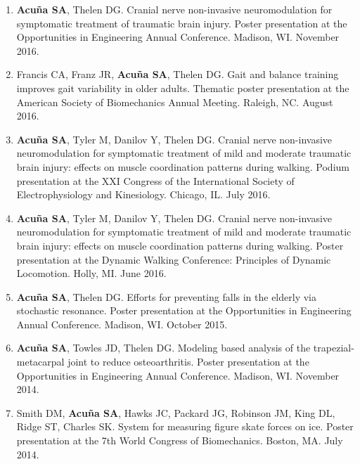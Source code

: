 \documentclass[letterpaper, 10pt]{article}
\begin{document}
\begin{enumerate}
    \item \textbf{Acuña SA}, Thelen DG. Cranial nerve non-invasive neuromodulation for symptomatic treatment of traumatic brain injury. Poster presentation at the Opportunities in Engineering Annual Conference. Madison, WI. November 2016.
    \item Francis CA, Franz JR, \textbf{Acuña SA}, Thelen DG. Gait and balance training improves gait variability in older adults. Thematic poster presentation at the American Society of Biomechanics Annual Meeting. Raleigh, NC. August 2016.
    \item \textbf{Acuña SA}, Tyler M, Danilov Y, Thelen DG. Cranial nerve non-invasive neuromodulation for symptomatic treatment of mild and moderate traumatic brain injury: effects on muscle coordination patterns during walking. Podium presentation at the XXI Congress of the International Society of Electrophysiology and Kinesiology. Chicago, IL. July 2016.
    \item \textbf{Acuña SA}, Tyler M, Danilov Y, Thelen DG. Cranial nerve non-invasive neuromodulation for symptomatic treatment of mild and moderate traumatic brain injury: effects on muscle coordination patterns during walking. Poster presentation at the Dynamic Walking Conference: Principles of Dynamic Locomotion. Holly, MI. June 2016.
    \item \textbf{Acuña SA}, Thelen DG. Efforts for preventing falls in the elderly via stochastic resonance. Poster presentation at the Opportunities in Engineering Annual Conference. Madison, WI. October 2015.
    \item \textbf{Acuña SA}, Towles JD, Thelen DG. Modeling based analysis of the trapezial-metacarpal joint to reduce osteoarthritis. Poster presentation at the Opportunities in Engineering Annual Conference. Madison, WI. November 2014.
    \item Smith DM, \textbf{Acuña SA}, Hawks JC, Packard JG, Robinson JM, King DL, Ridge ST, Charles SK. System for measuring ﬁgure skate forces on ice. Poster presentation at the 7th World Congress of Biomechanics. Boston, MA. July 2014.
    
\end{enumerate}

\end{document}
